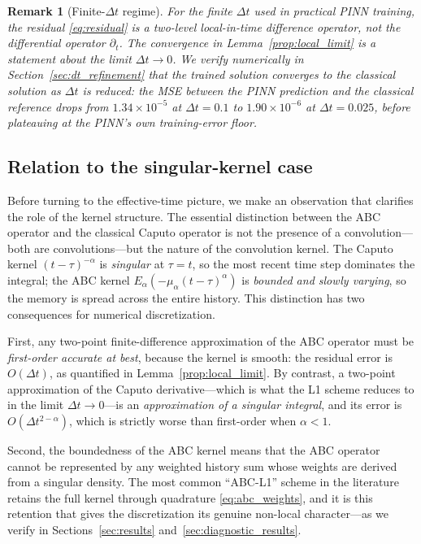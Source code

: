 \documentclass[11pt]{article}
\newtheorem{remark}{Remark}
\begin{document}
\begin{remark}[Finite-\(\Delta t\) regime]
\label{rem:finite_dt}
For the finite \(\Delta t\) used in practical PINN training, the residual \eqref{eq:residual} is a two-level local-in-time difference operator, not the differential operator \(\partial_t\). The convergence in Lemma~\ref{prop:local_limit} is a statement about the \emph{limit} \(\Delta t\to 0\). We verify numerically in Section~\ref{sec:dt_refinement} that the trained solution converges to the classical solution as \(\Delta t\) is reduced: the MSE between the PINN prediction and the classical reference drops from \(1.34\times 10^{-5}\) at \(\Delta t=0.1\) to \(1.90\times 10^{-6}\) at \(\Delta t=0.025\), before plateauing at the PINN's own training-error floor.
\end{remark}

\subsection{Relation to the singular-kernel case}
\label{sec:operator_structure}

Before turning to the effective-time picture, we make an observation that
clarifies the role of the kernel structure. The essential distinction
between the ABC operator and the classical Caputo operator is not the
presence of a convolution---both are convolutions---but the nature of
the convolution kernel. The Caputo kernel \((t-\tau)^{-\alpha}\) is
\emph{singular} at \(\tau = t\), so the most recent time step dominates
the integral; the ABC kernel
\(E_\alpha(-\mu_\alpha(t-\tau)^\alpha)\) is \emph{bounded and slowly
varying}, so the memory is spread across the entire history. This
distinction has two consequences for numerical discretization.

First, any two-point finite-difference approximation of the ABC operator
must be \emph{first-order accurate at best}, because the kernel is
smooth: the residual error is \(O(\Delta t)\), as quantified in
Lemma~\ref{prop:local_limit}. By contrast, a two-point approximation
of the Caputo derivative---which is what the L1 scheme reduces to in
the limit \(\Delta t \to 0\)---is an \emph{approximation of a singular
integral}, and its error is \(O(\Delta t^{2-\alpha})\), which is
strictly worse than first-order when \(\alpha < 1\).

Second, the boundedness of the ABC kernel means that the ABC operator
cannot be represented by any weighted history sum whose weights are
derived from a singular density. The most common ``ABC-L1'' scheme in
the literature retains the full kernel through quadrature
\eqref{eq:abc_weights}, and it is this retention that gives the
discretization its genuine non-local character---as we verify in
Sections~\ref{sec:results} and~\ref{sec:diagnostic_results}.
\end{document}
